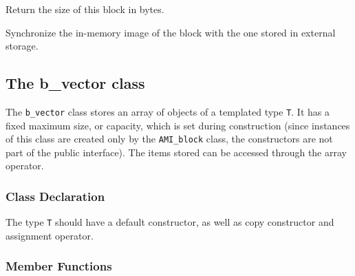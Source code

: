 	 {Return the size of this block
	in bytes.}

	 {Synchronize the in-memory image of the
	block with the one stored in external storage.}

   \etabb

\subsection{The  b\_vector class}

The {\tt b\_vector} class stores an array of objects of a templated type
{\tt T}. It has a fixed maximum size, or capacity, which is set during
construction (since instances of this class are created only by the
{\tt AMI\_block} class, the constructors are not part of the public
interface). The items stored can be accessed through the array operator.

\subsubsection{Class Declaration}
   \btabb 
	 {The type {\tt T}
	should have a default constructor, as well as copy constructor and
	assignment operator.}
   \etabb

%
%

\subsubsection{Member Functions}

   \btabb




